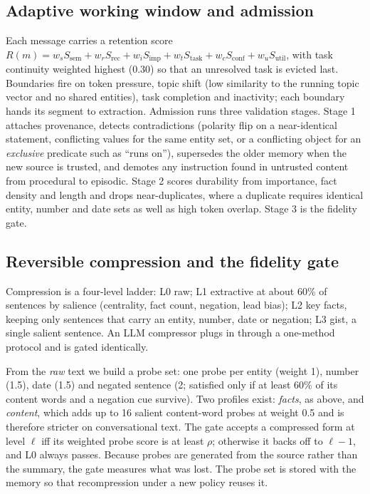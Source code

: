 \documentclass[journal]{IEEEtran}
\begin{document}
\subsection{Adaptive working window and admission}
Each message carries a retention score $R(m) = w_s S_{\mathrm{sem}} + w_r S_{\mathrm{rec}} + w_i S_{\mathrm{imp}} + w_t S_{\mathrm{task}} + w_c S_{\mathrm{conf}} + w_u S_{\mathrm{util}}$, with task continuity weighted highest (0.30) so that an unresolved task is evicted last. Boundaries fire on token pressure, topic shift (low similarity to the running topic vector and no shared entities), task completion and inactivity; each boundary hands its segment to extraction. Admission runs three validation stages. Stage 1 attaches provenance, detects contradictions (polarity flip on a near-identical statement, conflicting values for the same entity set, or a conflicting object for an \emph{exclusive} predicate such as ``runs on''), supersedes the older memory when the new source is trusted, and demotes any instruction found in untrusted content from procedural to episodic. Stage 2 scores durability from importance, fact density and length and drops near-duplicates, where a duplicate requires identical entity, number and date sets as well as high token overlap. Stage 3 is the fidelity gate.

\subsection{Reversible compression and the fidelity gate}
\label{sec:gate}
Compression is a four-level ladder: L0 raw; L1 extractive at about 60\% of sentences by salience (centrality, fact count, negation, lead bias); L2 key facts, keeping only sentences that carry an entity, number, date or negation; L3 gist, a single salient sentence. An LLM compressor plugs in through a one-method protocol and is gated identically.

From the \emph{raw} text we build a probe set: one probe per entity (weight 1), number (1.5), date (1.5) and negated sentence (2; satisfied only if at least 60\% of its content words and a negation cue survive). Two profiles exist: \emph{facts}, as above, and \emph{content}, which adds up to 16 salient content-word probes at weight 0.5 and is therefore stricter on conversational text. The gate accepts a compressed form at level $\ell$ iff its weighted probe score is at least $\rho$; otherwise it backs off to $\ell-1$, and L0 always passes. Because probes are generated from the source rather than the summary, the gate measures what was lost. The probe set is stored with the memory so that recompression under a new policy reuses it.
\end{document}
